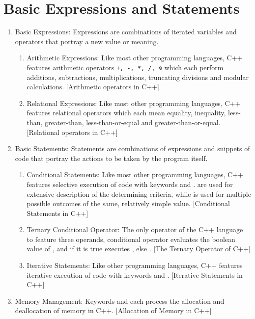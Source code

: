 \section{Basic Expressions and Statements}
\begin{enumerate}
\item Basic Expressions: Expressions are combinations of iterated variables
    and operators that portray a new value or meaning.
    \begin{enumerate}
    \item Arithmetic Expressions: Like most other programming languages, C++
        features arithmetic operators \verb|+, -, *, /, %| which each perform
        additions, subtractions, multiplications, truncating divisions and
        modular calculations. \begingroup
        [Arithmetic operators in C++]
        \endgroup
    \item Relational Expressions: Like most other programming languages, C++
        features relational operators \imc{==, !=, <, >, <=, >=} which each mean
        equality, inequality, less-than, greater-than, less-than-or-equal and
        greater-than-or-equal. \begingroup
        [Relational operators in C++]
        \endgroup
    \end{enumerate}
\item Basic Statements: Statements are combinations of expressions and snippets
    of code that portray the actions to be taken by the program itself.
    \begin{enumerate}
    \item Conditional Statements: Like most other programming languages, C++
        features selective execution of code with keywords  and
        .  are used for extensive description of the
        determining criteria, while  is used for multiple possible
        outcomes of the same, relatively simple value. \begingroup
        [Conditional Statements in C++]
        \endgroup
    \item Ternary Conditional Operator: The only operator of the C++ language to
        feature three operands, conditional operator 
        evaluates the boolean value of , and if it is true executes
        , else . \begingroup
        [The Ternary Operator of C++]
        \endgroup
    \item Iterative Statements: Like other programming languages, C++ features
        iterative execution of code with keywords  and .
        \begingroup
        [Iterative Statements in C++]
        \endgroup
    \end{enumerate}
\item Memory Management: Keywords  and  each process the
    allocation and deallocation of memory in C++. \begingroup
    [Allocation of Memory in C++]
    \endgroup
\end{enumerate}
